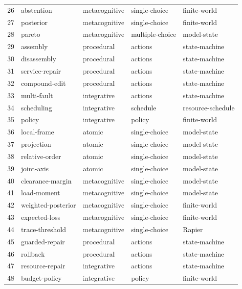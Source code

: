 \begin{center}
\begin{tabular}{rllll}
26 & abstention & metacognitive & single-choice & finite-world \\
27 & posterior & metacognitive & single-choice & finite-world \\
28 & pareto & metacognitive & multiple-choice & model-state \\
29 & assembly & procedural & actions & state-machine \\
30 & disassembly & procedural & actions & state-machine \\
31 & service-repair & procedural & actions & state-machine \\
32 & compound-edit & procedural & actions & state-machine \\
33 & multi-fault & integrative & actions & state-machine \\
34 & scheduling & integrative & schedule & resource-schedule \\
35 & policy & integrative & policy & finite-world \\
36 & local-frame & atomic & single-choice & model-state \\
37 & projection & atomic & single-choice & model-state \\
38 & relative-order & atomic & single-choice & model-state \\
39 & joint-axis & atomic & single-choice & model-state \\
40 & clearance-margin & metacognitive & single-choice & model-state \\
41 & load-moment & metacognitive & single-choice & model-state \\
42 & weighted-posterior & metacognitive & single-choice & finite-world \\
43 & expected-loss & metacognitive & single-choice & finite-world \\
44 & trace-threshold & metacognitive & single-choice & Rapier \\
45 & guarded-repair & procedural & actions & state-machine \\
46 & rollback & procedural & actions & state-machine \\
47 & resource-repair & integrative & actions & state-machine \\
48 & budget-policy & integrative & policy & finite-world \\
\bottomrule\end{tabular}\end{center}
